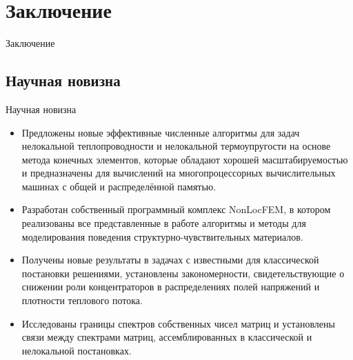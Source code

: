 \section{Заключение}

\begin{frame}
	\centering
	\Huge
	Заключение
\end{frame}


\subsection{Научная новизна}
\begin{frame}{Научная новизна}
    \begin{itemize}
        \item Предложены новые эффективные численные алгоритмы для задач нелокальной теплопроводности и нелокальной термоупругости на основе метода конечных элементов, которые обладают хорошей масштабируемостью и предназначены для вычислений на многопроцессорных вычислительных машинах с общей и распределённой памятью.
        \item Разработан собственный программный комплекс NonLocFEM, в котором реализованы все представленные в работе алгоритмы и методы для моделирования поведения структурно-чувствительных материалов.
        \item Получены новые результаты в задачах с известными для классической постановки решениями, установлены закономерности, свидетельствующие о снижении роли концентраторов в распределениях полей напряжений и плотности теплового потока.
        \item Исследованы границы спектров собственных чисел матриц и установлены связи между спектрами матриц, ассемблированных в классической и нелокальной постановках.
    \end{itemize}
\end{frame}


